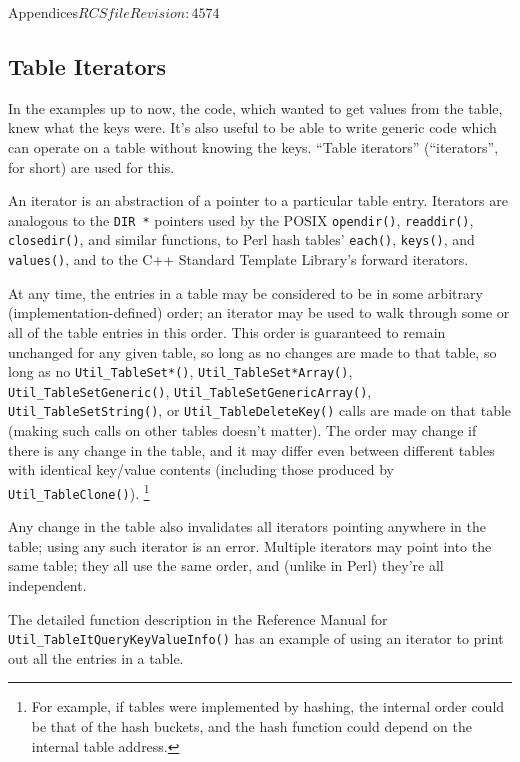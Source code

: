 \begin{cactuspart}{Appendices}{$RCSfile$}{$Revision: 4574 $}

\subsection{Table Iterators}
\label{sect-UtilityRoutines/tables/table-iterators}

In the examples up to now, the code, which wanted to get values from
the table, knew what the keys were.  It's also useful to be able to
write generic code which can operate on a table without knowing the
keys.  ``Table iterators'' (``iterators'', for short) are used for this.

An iterator is an abstraction of a pointer to a particular table entry.
Iterators are analogous to the \verb|DIR *| pointers used by the POSIX
\verb|opendir()|, \verb|readdir()|, \verb|closedir()|, and similar
functions, to Perl hash tables' \verb|each()|, \verb|keys()|,
and \verb|values()|, and to the C++ Standard Template Library's
forward iterators.

At any time, the entries in a table may be considered to be in some
arbitrary (implementation-defined) order; an iterator may be used to
walk through some or all of the table entries in this order.  This
order is guaranteed to remain unchanged for any given table, so long
as no changes are made to that table, \ie{} so long as no
\verb|Util_TableSet*()|, \verb|Util_TableSet*Array()|,
\verb|Util_TableSetGeneric()|, \verb|Util_TableSetGenericArray()|,
\verb|Util_TableSetString()|, or \verb|Util_TableDeleteKey()| calls
are made on that table (making such calls on other tables doesn't
matter).  The order may change if there is any change in the table,
and it may differ even between different tables with identical key/value
contents (including those produced by \verb|Util_TableClone()|).%
\footnote{%
	 For example, if tables were implemented by hashing,
	 the internal order could be that of the hash buckets,
	 and the hash function could depend on the internal
	 table address.
	 }%
{}

Any change in the table also invalidates all iterators pointing
anywhere in the table; using any such iterator is an error.
Multiple iterators may point into the same table; they all use the
same order, and (unlike in Perl) they're all independent.

The detailed function description
in the Reference Manual
for \verb|Util_TableItQueryKeyValueInfo()| has an example of
using an iterator to print out all the entries in a table.


\end{cactuspart}
